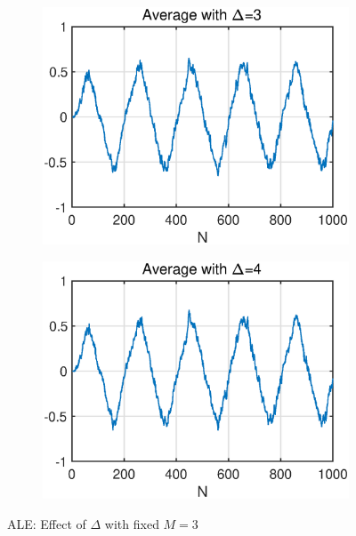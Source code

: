 \begin{figure}[htb]
\begin{subfigure}[b]{0.26\textwidth}
     \centering
     \includegraphics[width=\textwidth]{fig/23/23a6.eps}
    \end{subfigure}
    \hspace{-0.4cm}
    \begin{subfigure}[b]{0.26\textwidth}
     \centering
     \includegraphics[width=\textwidth]{fig/23/23a8.eps}
    \end{subfigure}
    \caption{ALE: Effect of $\Delta$ with fixed $M=3$}
    \label{fig:2_3_a}
\end{figure}
